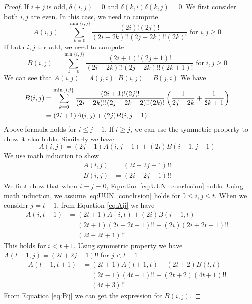 \documentclass{article}
\begin{document}
\begin{proof}
If $ i + j $ is odd, $ \delta(i, j) = 0 $ and
$ \delta(k, i)\delta(k, j) = 0 $.
We first consider both $ i, j $ are even. In this case, we need to compute
\begin{equation}\label{eq:even}
A(i, j) = \sum_{k=0}^{\min\{i,j\}}
\frac{(2i)!(2j)!}{(2i-2k)!!(2j-2k)!!(2k)!} \textrm{ for } i, j \geq 0
\end{equation}
If both $ i, j $ are odd, we need to compute
\begin{equation}\label{eq:odd}
B(i, j) = \sum_{k=0}^{\min\{i,j\}}
\frac{(2i+1)!(2j+1)!}{(2i-2k)!!(2j-2k)!!(2k+1)!} \textrm{ for } i,j \geq 0
\end{equation}
We can see that $A(i, j) = A(j, i)$,
$B(i, j) = B(j, i)$
We have
\begin{align}
B(i, j) &= \sum_{k=0}^{\min\{i,j\}}
\frac{(2i+1)!(2j)!}{(2i-2k)!!(2j-2k-2)!!(2k)!}
\left(\frac{1}{2j-2k} + \frac{1}{2k+1}\right) \notag\\
&= (2i + 1) A(i, j) + (2j) B(i, j-1) \label{eq:Bij}
\end{align}
Above formula holds for $ i \leq j-1 $.
If $ i \geq j $, we can use the symmetric property to show it also holds.
Similarly we have
\begin{equation}\label{eq:Aij}
A(i, j) = (2j - 1) A(i, j-1) + (2i) B(i-1, j-1)
\end{equation}
We use math induction to show
\begin{align}\label{eq:UUN_conclusion}
A(i, j) & = (2i + 2j - 1)!! \\
B(i, j) & = (2i + 2j + 1)!!
\end{align}
We first show that when $i = j = 0$,
Equation \eqref{eq:UUN_conclusion} holds.
Using math induction, we assume \eqref{eq:UUN_conclusion}
holds for $ 0 \leq i, j \leq t$. When we consider
$j = t + 1$, from Equation \eqref{eq:Aij} we have
\begin{align*}
A(i, t+1) & = (2t+1) A(i, t) + (2i) B(i-1, t) \\
& = (2t+1)(2i+2t-1)!! + (2i) (2i+2t-1)!! \\
& = (2i + 2t + 1)!!
\end{align*}
This holds for $ i < t + 1 $.
Using symmetric property we have $A(t+1, j) = (2t + 2j + 1)!!$ for
$ j < t + 1$
\begin{align*}
A(t+1, t+1) & = (2t+1)A(t+1, t) + (2t+2)B(t, t) \\
& = (2t-1)(4t+1)!! + (2t+2)(4t+1)!! \\
& = (4t+3)!!
\end{align*}
From Equation \eqref{eq:Bij} we can get the expression for $B(i, j)$.
\end{proof}
\end{document}
